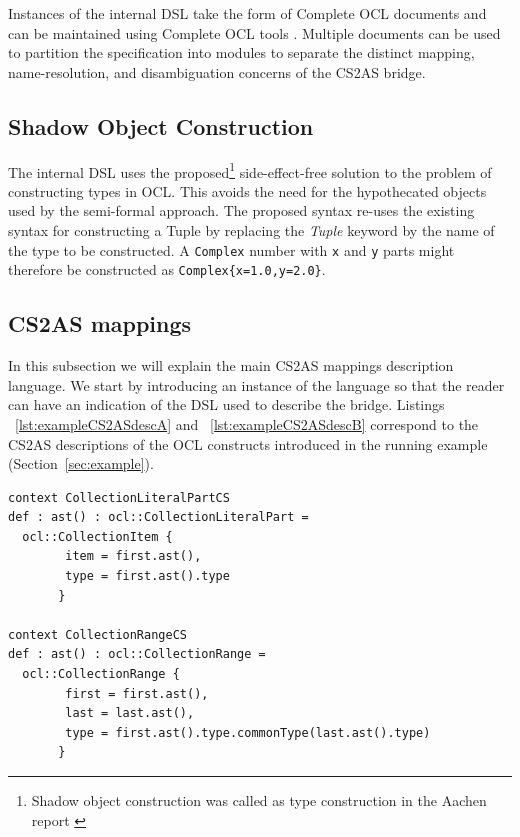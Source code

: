 \documentclass{llncs}
\begin{document}
Instances of the internal DSL take the form of Complete OCL documents and can be maintained using Complete OCL tools \cite{eclipseOclOnline}. Multiple documents can be used to partition the specification into modules %
to separate the distinct mapping, name-resolution, and disambiguation concerns of the CS2AS bridge.

\subsection{Shadow Object Construction}
\label{subsec:ShadowExp}

The internal DSL uses the proposed\footnote{Shadow object construction was called as type construction in the Aachen report \cite{brucker2013aachenReport}} side-effect-free solution to the problem of constructing types in OCL. This avoids the need for the hypothecated objects used by the semi-formal approach. The proposed syntax re-uses the existing syntax for constructing a Tuple by replacing the \emph{Tuple} keyword by the name of the type to be constructed. A \verb$Complex$ number with \verb$x$ and \verb$y$ parts might therefore be constructed as \verb$Complex{x=1.0,y=2.0}$. %

\subsection{CS2AS mappings}
\label{subsec:mappings}

In this subsection we will explain the main CS2AS mappings description language. We start by introducing an instance of the language so that the reader can have an indication of the DSL used to describe the bridge. Listings ~\ref{lst:exampleCS2ASdescA} and ~\ref{lst:exampleCS2ASdescB} correspond to the CS2AS descriptions of the OCL constructs introduced in the running example (Section~\ref{sec:example}).

\begin{lstlisting}[caption=CS2AS description for a collection literal part, label=lst:exampleCS2ASdescA, language=OCL]
context CollectionLiteralPartCS	
def : ast() : ocl::CollectionLiteralPart = 
  ocl::CollectionItem {
        item = first.ast(),	
        type = first.ast().type
       }
  
context CollectionRangeCS	
def : ast() : ocl::CollectionRange = 
  ocl::CollectionRange {
        first = first.ast(),
        last = last.ast(),
        type = first.ast().type.commonType(last.ast().type)
       }
\end{lstlisting}
\end{document}

